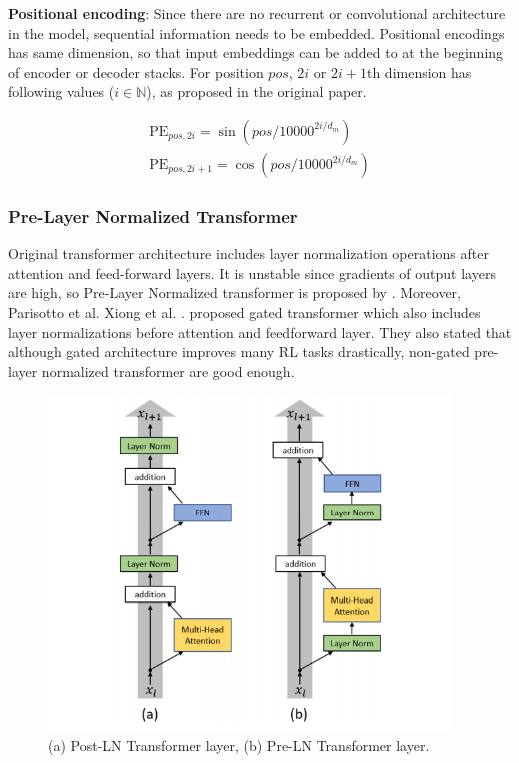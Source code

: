 \textbf{Positional encoding}: Since there are no recurrent or convolutional architecture in the model, sequential information needs to be embedded. Positional encodings has same dimension, so that input embeddings can be added to at the beginning of encoder or decoder stacks. For position $pos$, $2i$ or $2i+1$th dimension has following values ($i \in \mathbb{N}$), as proposed in the original paper.

\begin{equation}
\begin{split}
\mathrm{PE}_{pos,2i} = \sin(pos/10000^{2i/d_m}) \\
\mathrm{PE}_{pos,2i+1} = \cos(pos/10000^{2i/d_m})
\end{split}
\end{equation}

\subsubsection{Pre-Layer Normalized Transformer}
Original transformer architecture includes layer normalization operations after attention and feed-forward layers. It is unstable since gradients of output layers are high, so Pre-Layer Normalized transformer is proposed by \cite{xiong_layer_2020}. Moreover,  Parisotto et al. Xiong et al. \cite{parisotto_stabilizing_2019}. proposed gated transformer which also includes layer normalizations before attention and feedforward layer. They also stated that although gated architecture improves many RL tasks drastically, non-gated pre-layer normalized transformer are good enough. 

\begin{figure}
	\centering
	\includegraphics[width=0.95\textwidth]{figures/ml_theory/post_pre_trsf.png}
	\caption{(a) Post-LN Transformer layer, (b) Pre-LN Transformer
		layer.}
	\label{fig:post_pre_trsf}
\end{figure}

